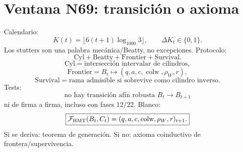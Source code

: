 
\section*{Ventana N69: transición o axioma}
Calendario:
\[
K(t)=\lfloor6(t+1)\log_{1000}3\rfloor,
\qquad
\Delta K_t\in\{0,1\}.
\]
Los stutters son una palabra mecánica/Beatty, no excepciones.
Protocolo:
\[
\boxed{\text{Cyl}+\text{Beatty}+\text{Frontier}+\text{Survival}.}
\]
\[
\text{Cyl}=\text{intersección intervalar de cilindros},
\]
\[
\text{Frontier}=B_t\mapsto(q,a,c,\operatorname{colw},\rho_W,r),
\]
\[
\text{Survival}=\text{rama admisible si sobrevive como cilindro inverso}.
\]
Tests:
\[
\text{no hay transición afín robusta }B_t\to B_{t+1}
\]
ni de firma a firma, incluso con fases \(12/22\).
Blanco:
\[
\boxed{
\mathcal F_{\rm HMT}(B_t,C_t)
=
(q,a,c,\operatorname{colw},\rho_W,r)_{t+1}.
}
\]
Si se deriva: teorema de generación. Si no: axioma coinductivo de frontera/supervivencia.
